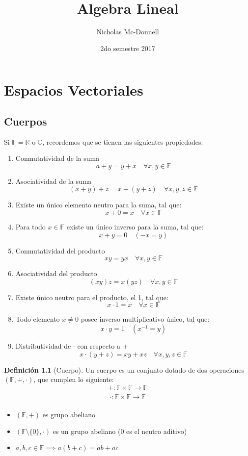 \documentclass[11pt]{book}
\title{Algebra Lineal}
\author{Nicholas Mc-Donnell}
\date{2do semestre 2017}
\newcommand{\set}[1]{\mathbb{#1}}
\newcommand{\func}[5]{#1:#2\xrightarrow[#5]{#4}#3}
\theoremstyle{definition}
\newtheorem{defn}{Definición}[section]
\begin{document}
\maketitle
{}

\tableofcontents
{}
\chapter{Espacios Vectoriales}
\section{Cuerpos}
Si $\set{F}=\set{R}$ o $\set{C}$, recordemos que se tienen las siguientes propiedades:
\begin{enumerate}
	\item Conmutatividad de la suma
	\[a+y=y+x\quad\forall x,y\in\set{F}\]

	\item Asociatividad de la suma
	\[(x+y)+z=x+(y+z)\quad\forall x,y,z\in\set{F}\]

	\item Existe un único elemento neutro para la suma, tal que:
	\[x+0=x\quad\forall x\in\set{F}\]

	\item Para todo $x\in\set{F}$ existe un único inverso para la suma, tal que:
	\[x+y=0\quad (-x=y)\]

	\item Conmutatividad del producto
	\[xy=yx\quad\forall x,y\in\set{F}\]

	\item Asociatividad del producto
	\[(xy)z=x(yz)\quad\forall x,y\in\set{F}\]

	\item Existe único neutro para el producto, el 1, tal que:
	\[x\cdot 1=x\quad\forall x\in\set{F}\]

	\item Todo elemento $x\neq 0$ posee inverso multiplicativo único, tal que:
	\[x\cdot y=1\quad (x^{-1}=y)\]

	\item Distributividad de $\cdot$ con respecto a $+$
	\[x\cdot (y+z)=xy+xz\quad\forall x,y,z\in\set{F}\]
\end{enumerate}
\begin{defn}[Cuerpo]
	Un cuerpo es un conjunto dotado de dos operaciones $(\set{F},+,\cdot)$, que cumplen lo siguiente:
	\[\func{+}{\set{F}\times\set{F}}{\set{F}}{}{}\]
	\[\func{\cdot}{\set{F}\times\set{F}}{\set{F}}{}{}\]
	\begin{itemize}
		\item $(\set{F},+)$ es grupo abeliano

		\item $(\set{F}\setminus\{0\},\cdot)$ es un grupo abeliano ($0$ es el neutro aditivo)

		\item $a,b,c\in\set{F}\implies a(b+c)=ab+ac$
	\end{itemize}
\end{defn}
\end{document}
